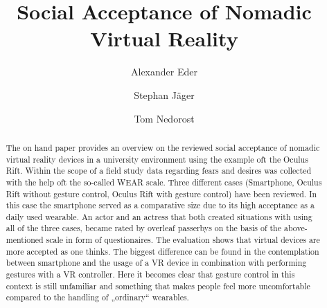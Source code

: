 \documentclass[sigchi]{acmart}
\begin{document}
\title{Social Acceptance of Nomadic Virtual Reality}

\author{Alexander Eder}

\author{Stephan Jäger}

\author{Tom Nedorost}

\renewcommand{\shortauthors}{Eder and Jäger and Nedorost}
\linenumbers

\begin{abstract}
The on hand paper provides an overview on the reviewed social acceptance of nomadic virtual reality devices in a university environment using the example oft the Oculus Rift. Within the scope of a field study data regarding fears and desires was collected with the help oft the so-called WEAR scale. Three different cases (Smartphone, Oculus Rift without gesture control, Oculus Rift with gesture control) have been reviewed. In this case the smartphone served as a comparative size due to its high acceptance as a daily used wearable. An actor and an actress that both created situations with using all of the three cases, became rated by overleaf passerbys on the basis of the above-mentioned scale in form of questionaires. The evaluation shows that virtual devices are more accepted as one thinks. The biggest difference can be found in the contemplation between smartphone and the usage of a VR device in combination with performing gestures with a VR controller. Here it becomes clear that gesture control in this context is still unfamiliar and something that makes people feel more uncomfortable compared to the handling of „ordinary“ wearables.
\end{abstract}
\end{document}
